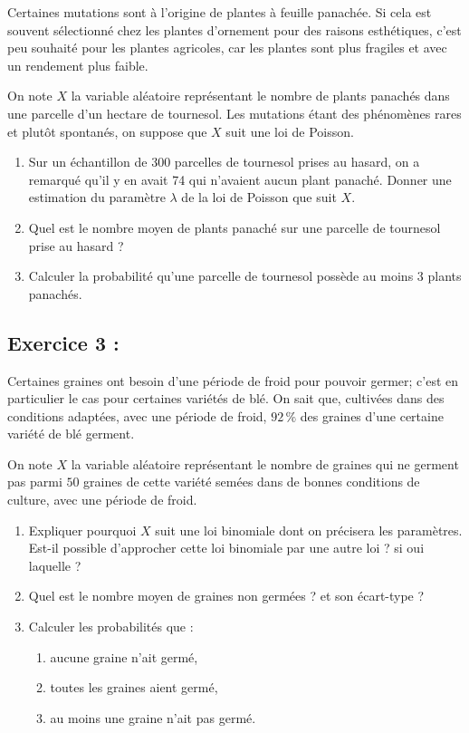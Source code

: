 \documentclass[11pt]{article}
\numberwithin{equation}{section}
\begin{document}
\noindent
Certaines mutations sont à l'origine de plantes à feuille panachée. Si cela est souvent sélectionné 
chez les plantes d'ornement pour des raisons esthétiques, c'est peu souhaité pour les plantes 
agricoles, car les plantes sont plus fragiles et avec un rendement plus faible. 

On note $X$ la variable aléatoire représentant le nombre de plants panachés dans une parcelle d'un 
hectare de tournesol. Les mutations étant des phénomènes rares et plutôt spontanés, 
on suppose que $X$ suit une loi de Poisson.

\begin{enumerate}
\item Sur un échantillon de 300 parcelles de tournesol prises au hasard, on a remarqué qu'il y en 
avait 74 qui n'avaient aucun plant panaché. Donner une estimation du paramètre $\lambda$ de la loi
de Poisson que suit $X$.
\item Quel est le nombre moyen de plants panaché sur une parcelle de tournesol prise au hasard ?
\item Calculer la probabilité qu'une parcelle de tournesol possède au moins 3 plants panachés.
\end{enumerate}

\bigskip

\subsection*{Exercice 3 : }

Certaines graines ont besoin d'une période de froid pour pouvoir germer; c'est en particulier le cas 
pour certaines variétés de blé. On sait que, cultivées dans des conditions adaptées, avec une période de froid, $92\,\%$  
des graines d'une certaine variété de blé germent. 

On note $X$ la variable aléatoire représentant le nombre de graines qui ne germent pas parmi $50$ 
graines de cette variété semées dans de bonnes conditions de culture, avec une période de froid. 
\begin{enumerate}
\item Expliquer pourquoi $X$ suit une loi binomiale dont on précisera les paramètres. \\
Est-il possible d'approcher cette loi binomiale par une autre loi ? si oui laquelle ?
\item Quel est le nombre moyen de graines non germées ? et son écart-type ? 
\item Calculer les probabilités que : 
\begin{enumerate}
\item aucune graine n'ait germé, 
\item toutes les graines aient germé,
\item au moins une graine n'ait pas germé.  
\end{enumerate}
\end{enumerate}
\thispagestyle{empty}
\end{document}
